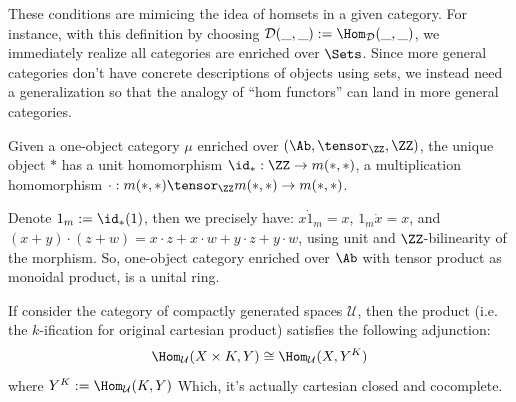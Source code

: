 \documentclass{article}
\begin{document}
These conditions are mimicing the idea of homsets in a given category. For instance, with this definition by choosing $\mathcal{D}(\_,\_):= \Hom_\mathcal{D}(\_,\_)$, we immediately realize all categories are enriched over $\Sets$. Since more general categories don't have concrete descriptions of objects using sets, we instead need a generalization so that the analogy of ``hom functors'' can land in more general categories. 


\hfil

\begin{exmp}
    Given a one-object category $\mu$ enriched over $(\Ab,\tensor_\ZZ,\ZZ)$, the unique object $*$ has a unit homomorphism $\id_*:\ZZ\rightarrow m(*,*)$, a multiplication homomorphism $\cdot:m(*,*)\tensor_\ZZ m(*,*)\rightarrow m(*,*)$. 

    Denote $1_m:=\id_* (1)$, then we precisely have: $x\dot 1_m=x$, $1_m\dot x=x$, and $(x+y)\cdot (z+w)=x\cdot z+x\cdot w+y\cdot z+y\cdot w$, using unit and $\ZZ$-bilinearity of the morphism. So, one-object category enriched over $\Ab$ with tensor product as monoidal product, is a unital ring.
\end{exmp}

\begin{exmp}
    If consider the category of compactly generated spaces $\mathcal{U}$, then the product (i.e. the $k$-ification for original cartesian product) satisfies the following adjunction:
    \[\Hom_\mathcal{U}(X\times K,Y)\cong \Hom_\mathcal{U}(X,Y^K)\]
    where $Y^K:=\Hom_\mathcal{U}(K,Y)$
    Which, it's actually cartesian closed and cocomplete.
\end{exmp}

\end{document}
